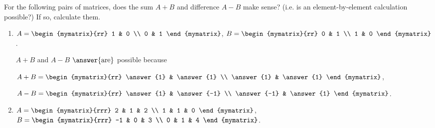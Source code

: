 \documentclass{ximera}
\author{Zack Reed}
\begin{document}
\begin{problem}
  For the following pairs of matrices, does the sum $A+B$ and difference $A-B$ make sense? (i.e. is an element-by-element calculation possible?) If so, calculate them.
  \begin{enumerate}
  \item
    $A = \begin{mymatrix}{rr}
      1 & 0 \\
      0 & 1
    \end{mymatrix}$,\quad
    $B = \begin{mymatrix}{rr}
      0 & 1 \\
      1 & 0
    \end{mymatrix}$.

    \begin{sol}
    

      $A+B$ and $A-B$ $\answer{\text{are}}$ possible because 

      \begin{selectAll}
      \end{selectAll}

      $A+B = \begin{mymatrix}{rr}
        \answer{1} & \answer{1} \\
        \answer{1} & \answer{1}
      \end{mymatrix}$,\quad

      $A-B = \begin{mymatrix}{rr}
        \answer{1} & \answer{-1} \\
        \answer{-1} & \answer{1}
      \end{mymatrix}$.


    \end{sol}

  \item
    $A = \begin{mymatrix}{rrr}
      2 & 1 & 2 \\
      1 & 1 & 0
    \end{mymatrix}$,\quad
    $B = \begin{mymatrix}{rrr}
      -1 & 0 & 3 \\
      0 & 1 & 4
    \end{mymatrix}$.


\end{enumerate}
\end{problem}
\end{document}
